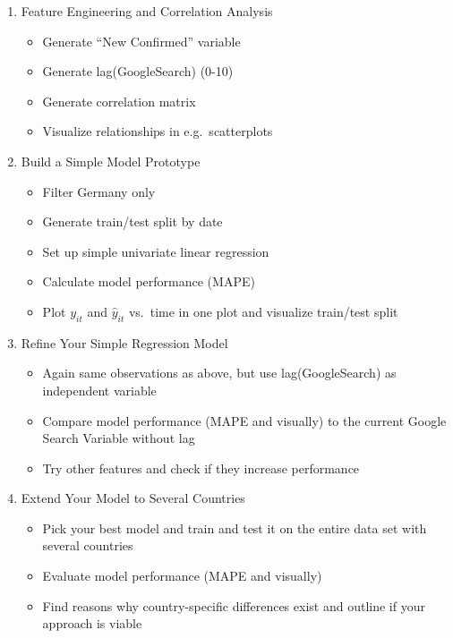 \documentclass[
  11pt,
]{article}
\providecommand{\tightlist}{%
  \setlength{\itemsep}{0pt}\setlength{\parskip}{0pt}}
\begin{document}
\begin{enumerate}
\def\labelenumi{\arabic{enumi}.}
\tightlist
\item
  Feature Engineering and Correlation Analysis

  \begin{itemize}
  \tightlist
  \item
    Generate ``New Confirmed'' variable
  \item
    Generate lag(GoogleSearch) (0-10)
  \item
    Generate correlation matrix
  \item
    Visualize relationships in e.g.~scatterplots
  \end{itemize}
\item
  Build a Simple Model Prototype

  \begin{itemize}
  \tightlist
  \item
    Filter Germany only
  \item
    Generate train/test split by date
  \item
    Set up simple univariate linear regression
  \item
    Calculate model performance (MAPE)
  \item
    Plot \(y_{it}\) and \(\hat{y}_{it}\) vs.~time in one plot and visualize train/test split
  \end{itemize}
\item
  Refine Your Simple Regression Model

  \begin{itemize}
  \tightlist
  \item
    Again same observations as above, but use lag(GoogleSearch) as independent variable
  \item
    Compare model performance (MAPE and visually) to the current Google Search Variable without lag
  \item
    Try other features and check if they increase performance
  \end{itemize}
\item
  Extend Your Model to Several Countries

  \begin{itemize}
  \tightlist
  \item
    Pick your best model and train and test it on the entire data set with several countries
  \item
    Evaluate model performance (MAPE and visually)
  \item
    Find reasons why country-specific differences exist and outline if your approach is viable
  \end{itemize}
\end{enumerate}

  
\end{document}
